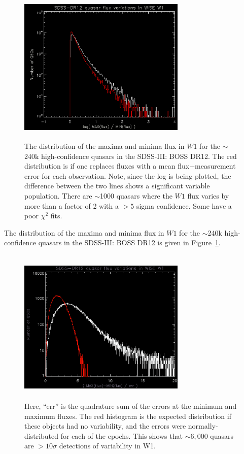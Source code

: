 \documentclass{emulateapj}
\begin{document}
\begin{figure}
  \includegraphics[width=8.00cm, height=7.50cm, trim=0.0cm 0.0cm 0.0cm 0.0cm, clip]
  {fig1.png}
  \centering
  \caption[]{
    The distribution of the maxima and
    minima flux in $W1$ for the $\sim$240k high-confidence quasars in the
    SDSS-III: BOSS DR12.  The red distribution is if one replaces fluxes
    with a mean flux$+$measurement error for each observation.  Note,
    since the log is being plotted, the difference between the two lines
    shows a significant variable population.  There are $\sim$1000 quasars
    where the $W1$ flux varies by more than a factor of 2 with a $>5$
    sigma confidence.  Some have a poor $\chi{^2}$ fits.
  }
  \label{fig:maxminflux}
\end{figure}
The distribution of the maxima and minima flux in $W1$ for the
$\sim$240k high-confidence quasars in the SDSS-III: BOSS DR12 is given
in Figure~\ref{fig:maxminflux}.

\begin{figure}
  \includegraphics[width=8.00cm, height=7.50cm, trim=0.0cm 0.0cm 0.0cm 0.0cm, clip]
  {fig2.png}
  \centering
  \caption[]{
    Here, ``err'' is the quadrature sum of the errors at the minimum and maximum fluxes.
    The red histogram is the expected distribution if these objects had no variability, 
    and the errors were normally-distributed for each of the epochs.
    This shows that $\sim6,000$ quasars are $>10\sigma$ detections of variability in W1.
  }
  \label{fig:maxmin_err}
\end{figure}
\end{document}
